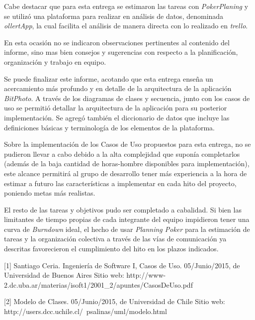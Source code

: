 \documentclass{memoria}
\begin{document}
Cabe destacar que para esta entrega se estimaron las tareas con \textsl{PokerPlaning} y se utilizó una plataforma para realizar en análisis de datos, denominada \textsl{ollertApp}, la cual facilita el análisis de manera directa con lo realizado en \textsl{trello}.



En esta ocasión no se indicaron observaciones pertinentes al contenido del informe, sino mas bien consejos y sugerencias con respecto a la planificación, organización y trabajo en equipo.


Se puede finalizar este informe, acotando que esta entrega enseña un acercamiento más profundo y en detalle de la arquitectura de la aplicación \textsl{BitPhoto}. A través de los diagramas de clases y secuencia, junto con los casos de uso se permitió detallar la arquitectura de la aplicación para su posterior implementación. Se agregó también el diccionario de datos que incluye las definiciones básicas y terminología de los elementos de la plataforma.

Sobre la implementación de los Casos de Uso propuestos para esta entrega, no se pudieron llevar a cabo debido a la alta complejidad que suponía completarlos (además de la baja cantidad de horas-hombre disponibles para implementación), este alcance permitirá al grupo de desarrollo tener más experiencia a la hora de estimar a futuro las características a implementar en cada hito del proyecto, poniendo metas más realistas.

El resto de las tareas y objetivos pudo ser completado a cabalidad. Si bien las limitantes de tiempo propias de cada integrante del equipo impidieron tener una curva de \textsl{Burndown} ideal, el hecho de usar \textsl{Planning Poker} para la estimación de tareas y la organización colectiva a través de las vías de comunicación ya descritas favorecieron el cumplimiento del hito en los plazos indicados.





[1] Santiago Ceria. Ingeniería de Software I, Casos de Uso. 05/Junio/2015, de Universidad de Buenos Aires 
Sitio web: http://www-2.dc.uba.ar/materias/isoft1/2001\_2/apuntes/CasosDeUso.pdf


[2] Modelo de Clases. 05/Junio/2015, de Universidad de Chile 
Sitio web: http://users.dcc.uchile.cl/~psalinas/uml/modelo.html
\end{document}
